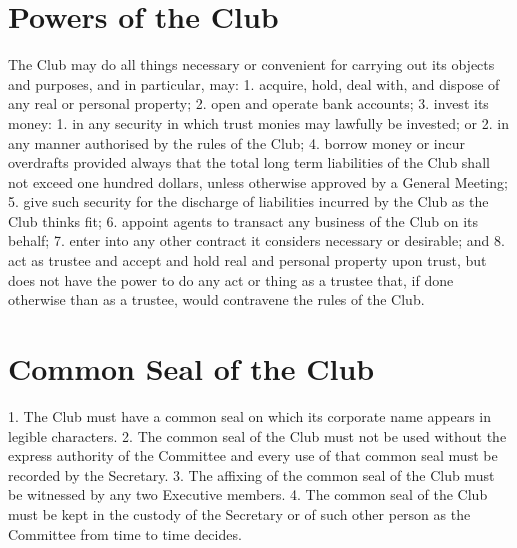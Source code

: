 \documentclass[12pt]{article} %
\begin{document}
\section{Powers of the Club}
The Club may do all things necessary or convenient for carrying out its objects and purposes,
and in particular, may:
1. acquire, hold, deal with, and dispose of any real or personal property;
2. open and operate bank accounts;
3. invest its money:
1. in any security in which trust monies may lawfully be invested; or
2. in any manner authorised by the rules of the Club;
4. borrow money or incur overdrafts provided always that the total long term liabilities
of the Club shall not exceed one hundred dollars, unless otherwise approved by a
General Meeting;
5. give such security for the discharge of liabilities incurred by the Club as the Club
thinks fit;
6. appoint agents to transact any business of the Club on its behalf;
7. enter into any other contract it considers necessary or desirable; and
8. act as trustee and accept and hold real and personal property upon trust, but does not
have the power to do any act or thing as a trustee that, if done otherwise than as a
trustee, would contravene the rules of the Club.

\section{Common Seal of the Club}
1. The Club must have a common seal on which its corporate name appears in legible
characters.
2. The common seal of the Club must not be used without the express authority of the
Committee and every use of that common seal must be recorded by the Secretary.
3. The affixing of the common seal of the Club must be witnessed by any two Executive
members.
4. The common seal of the Club must be kept in the custody of the Secretary or of such
other person as the Committee from time to time decides.
\end{document}
